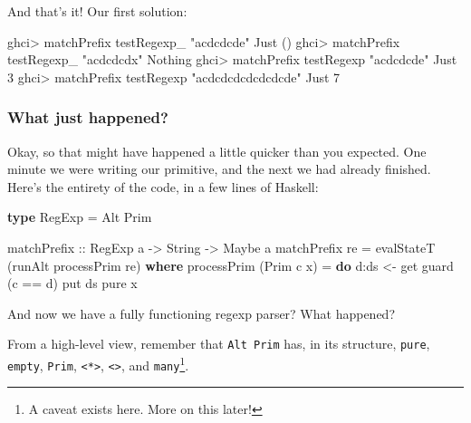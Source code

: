 \documentclass[]{article}
\newenvironment{Shaded}{}{}
\newcommand{\DataTypeTok}[1]{\textcolor[rgb]{0.56,0.13,0.00}{#1}}
\newcommand{\DecValTok}[1]{\textcolor[rgb]{0.25,0.63,0.44}{#1}}
\newcommand{\FunctionTok}[1]{\textcolor[rgb]{0.02,0.16,0.49}{#1}}
\newcommand{\KeywordTok}[1]{\textcolor[rgb]{0.00,0.44,0.13}{\textbf{#1}}}
\newcommand{\NormalTok}[1]{#1}
\newcommand{\OtherTok}[1]{\textcolor[rgb]{0.00,0.44,0.13}{#1}}
\newcommand{\StringTok}[1]{\textcolor[rgb]{0.25,0.44,0.63}{#1}}
\begin{document}
And that's it! Our first solution:

\begin{Shaded}
\begin{Highlighting}[]
\NormalTok{ghci}\FunctionTok{>}\NormalTok{ matchPrefix testRegexp_ }\StringTok{"acdcdcde"}
\DataTypeTok{Just}\NormalTok{ ()}
\NormalTok{ghci}\FunctionTok{>}\NormalTok{ matchPrefix testRegexp_ }\StringTok{"acdcdcdx"}
\DataTypeTok{Nothing}
\NormalTok{ghci}\FunctionTok{>}\NormalTok{ matchPrefix testRegexp }\StringTok{"acdcdcde"}
\DataTypeTok{Just} \DecValTok{3}
\NormalTok{ghci}\FunctionTok{>}\NormalTok{ matchPrefix testRegexp }\StringTok{"acdcdcdcdcdcdcde"}
\DataTypeTok{Just} \DecValTok{7}
\end{Highlighting}
\end{Shaded}

\hypertarget{what-just-happened}{%
\subsubsection{What just happened?}\label{what-just-happened}}

Okay, so that might have happened a little quicker than you expected. One minute
we were writing our primitive, and the next we had already finished. Here's the
entirety of the code, in a few lines of Haskell:

\begin{Shaded}
\begin{Highlighting}[]
\KeywordTok{type} \DataTypeTok{RegExp} \FunctionTok{=} \DataTypeTok{Alt} \DataTypeTok{Prim}

\OtherTok{matchPrefix ::} \DataTypeTok{RegExp}\NormalTok{ a }\OtherTok{->} \DataTypeTok{String} \OtherTok{->} \DataTypeTok{Maybe}\NormalTok{ a}
\NormalTok{matchPrefix re }\FunctionTok{=}\NormalTok{ evalStateT (runAlt processPrim re)}
  \KeywordTok{where}
\NormalTok{    processPrim (}\DataTypeTok{Prim}\NormalTok{ c x) }\FunctionTok{=} \KeywordTok{do}
\NormalTok{      d}\FunctionTok{:}\NormalTok{ds }\OtherTok{<-}\NormalTok{ get}
\NormalTok{      guard (c }\FunctionTok{==}\NormalTok{ d)}
\NormalTok{      put ds}
      \FunctionTok{pure}\NormalTok{ x}
\end{Highlighting}
\end{Shaded}

And now we have a fully functioning regexp parser? What happened?

From a high-level view, remember that \texttt{Alt\ Prim} has, in its structure,
\texttt{pure}, \texttt{empty}, \texttt{Prim},
\texttt{\textless{}*\textgreater{}},
\texttt{\textless{}\textbar{}\textgreater{}}, and \texttt{many}\footnote{A
  caveat exists here. More on this later!}.
\end{document}

